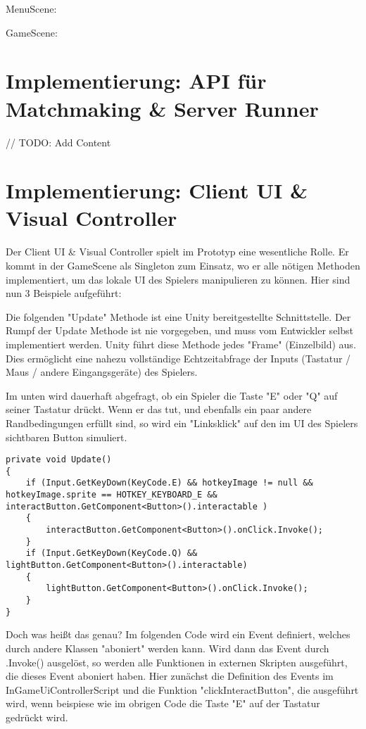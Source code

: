 MenuScene:

GameScene:

\section{Implementierung: API für Matchmaking \& Server Runner}

// TODO: Add Content

\section{Implementierung: Client UI \& Visual Controller}

Der Client UI \& Visual Controller spielt im Prototyp eine wesentliche Rolle. Er kommt in der GameScene als Singleton \cite{M.Gatrell.2009} zum Einsatz, wo er alle nötigen Methoden implementiert, um das lokale UI des Spielers manipulieren zu können. Hier sind nun 3 Beispiele aufgeführt:

Die folgenden "Update" Methode ist eine Unity bereitgestellte Schnittstelle. Der Rumpf der Update Methode ist nie vorgegeben, und muss vom Entwickler selbst implementiert werden. Unity führt diese Methode jedes "Frame" (Einzelbild) \cite{Wikipedia.2021j} aus. Dies ermöglicht eine nahezu vollständige Echtzeitabfrage der Inputs (Tastatur / Maus / andere Eingangsgeräte) des Spielers.

Im unten wird dauerhaft abgefragt, ob ein Spieler die Taste "E" oder "Q" auf seiner Tastatur drückt. Wenn er das tut, und ebenfalls ein paar andere Randbedingungen erfüllt sind, so wird ein "Linksklick" auf den im UI des Spielers sichtbaren Button simuliert.

\begin{lstlisting}[caption= InGameUiControllerScript.cs Update Method]
private void Update()
{
	if (Input.GetKeyDown(KeyCode.E) && hotkeyImage != null && hotkeyImage.sprite == HOTKEY_KEYBOARD_E && interactButton.GetComponent<Button>().interactable )
	{
		interactButton.GetComponent<Button>().onClick.Invoke();
	}
	if (Input.GetKeyDown(KeyCode.Q) && lightButton.GetComponent<Button>().interactable)
	{
		lightButton.GetComponent<Button>().onClick.Invoke();
	}
}
\end{lstlisting}

Doch was heißt das genau? Im folgenden Code wird ein Event definiert, welches durch andere Klassen "aboniert" werden kann. Wird dann das Event durch .Invoke() ausgelöst, so werden alle Funktionen in externen Skripten ausgeführt, die dieses Event aboniert haben. Hier zunächst die Definition des Events im InGameUiControllerScript und die Funktion "clickInteractButton", die ausgeführt wird, wenn beispiese wie im obrigen Code die Taste "E" auf der Tastatur gedrückt wird.

